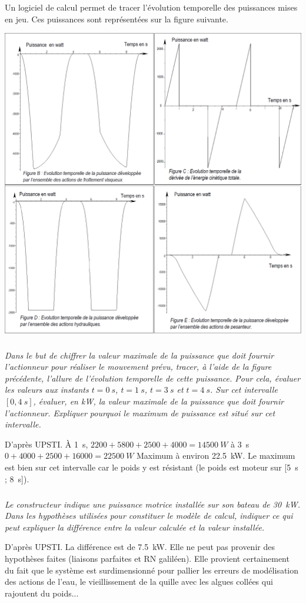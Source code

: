 \begin{multicols}{2}
Un logiciel de calcul permet de tracer l’évolution temporelle des puissances mises en jeu. Ces puissances sont
représentées sur la figure suivante. 

\begin{center}
\includegraphics[width=.8\linewidth]{images/fig_07}
\end{center}

\fi

\subparagraph{}\textit{Dans le but de chiffrer la valeur maximale de la puissance que doit fournir l’actionneur pour réaliser
le mouvement prévu, tracer, à l’aide de la figure précédente, l’allure de
l’évolution temporelle de cette puissance. Pour cela, évaluer les valeurs aux instants $t=\SI{0}{s}$, $t=\SI{1}{s}$,
$t=\SI{3}{s}$ et $t=\SI{4}{s}$.
Sur cet intervalle $[0,\SI{4}{s}]$, évaluer, en kW, la valeur maximale de la puissance que doit fournir
l’actionneur. Expliquer pourquoi le maximum de puissance est situé sur cet intervalle.}
\ifprof
\begin{corrige}
D'après UPSTI. À \SI{1}{s}, $2200+5800+2500+4000=\SI{14500}{W}$ à \SI{3}{s}
$0+4000+2500+16000=\SI{22500}{W}$
Maximum à environ \SI{22,5}{kW}.
Le maximum est bien sur cet intervalle car le poids y est résistant (le poids est moteur sur
[\SI{5}{s} ; \SI{8}{s}]).

\end{corrige}
\else
\fi
\subparagraph{}\textit{
Le constructeur indique une puissance motrice installée sur son bateau de \SI{30}{kW}.
Dans les hypothèses utilisées pour constituer le modèle de calcul, indiquer ce qui peut expliquer la
différence entre la valeur calculée et la valeur installée.}
\ifprof
\begin{corrige}
D'après UPSTI. La différence est de \SI{7,5}{kW}.
Elle ne peut pas provenir des hypothèses faites (liaisons parfaites et RN galiléen).
Elle provient certainement du fait que le système est surdimensionné
pour pallier les erreurs de modélisation des actions de l'eau, le vieillissement de la quille avec
les algues collées qui rajoutent du poids...
\end{corrige}
\else
\fi


\ifprof
\else
\end{multicols}
\fi


